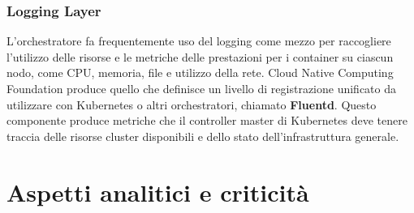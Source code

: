 \documentclass[12pt, a4paper]{report}
\begin{document}
\subsection{Logging Layer}
L'orchestratore fa frequentemente uso del logging come mezzo per raccogliere l'utilizzo delle risorse e le metriche delle prestazioni per i container su ciascun nodo, come CPU, memoria, file e utilizzo della rete. Cloud Native Computing Foundation produce quello che definisce un livello di registrazione unificato da utilizzare con Kubernetes o altri orchestratori, chiamato \textbf{Fluentd}. Questo componente produce metriche che il controller master di Kubernetes deve tenere traccia delle risorse cluster disponibili e dello stato dell'infrastruttura generale.
\chapter{Aspetti analitici e criticità}
\end{document}
